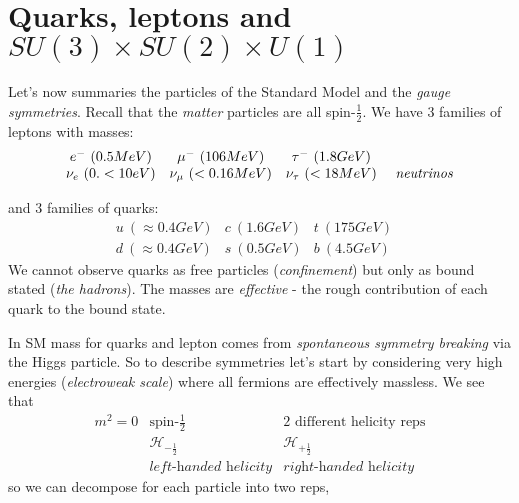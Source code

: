 \section{Quarks, leptons and $SU(3)\times SU(2)\times U(1)$}

Let's now summaries the particles of the Standard Model and the \textit{gauge symmetries}. Recall that the \textit{matter} particles are all spin-$\frac{1}{2}$. We have 3 families of leptons with masses: 
\begin{equation}
    \begin{matrix}
        e^-\ (0.5 MeV)&\mu^-\ (106 MeV)&\tau^-\ (1.8 GeV)\\
        \nu_e\ (0.<10eV)&\nu_{\mu}\ (<0.16 MeV)&\nu_{\tau}\ (<18 MeV)& \text{ \textit{neutrinos}}\\
    \end{matrix}
\end{equation}

and 3 families of quarks: 
\begin{equation}
    \begin{matrix}
        u\ (\approx 0.4 GeV)& c\ (1.6 GeV) & t\ (175 GeV)\\
        d \ (\approx 0.4 GeV)&s\ (0.5 GeV)&b \ (4.5 GeV)&
    \end{matrix}
\end{equation}
We cannot observe quarks as free particles (\textit{confinement}) but only as bound stated (\textit{the hadrons}). The masses are \textit{effective} - the rough contribution of each quark to the bound state.

In SM mass for quarks and lepton comes from \textit{spontaneous symmetry breaking} via the Higgs particle. So to describe symmetries let's start by considering very high energies (\textit{electroweak scale}) where all fermions are effectively massless. We see that 
\begin{equation}
    \begin{matrix}
        m^2 = 0 & \text{spin-}\frac{1}{2} & \text{2 different helicity reps}\\
        &\mathcal{H}_{-\frac{1}{2}} & \mathcal{H}_{+\frac{1}{2}}\\
        & \textit{left-handed helicity}& \textit{right-handed helicity} 
    \end{matrix}
\end{equation}
so we can decompose for each particle into two reps, 

